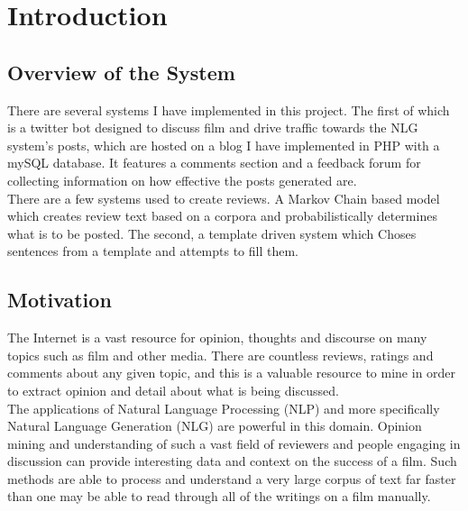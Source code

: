 %

\chapter{\label{ch:1-intro}Introduction} 

\minitoc

\section{Overview of the System}

There are several systems I have implemented in this project. The first of which is a twitter bot designed to discuss film and drive traffic towards the NLG system's posts, which are hosted on a blog I have implemented in PHP with a mySQL database. It features a comments section and a feedback forum for collecting information on how effective the posts generated are.\\
There are a few systems used to create reviews. A Markov Chain based model which creates review text based on a corpora and probabilistically determines what is to be posted.
The second, a template driven system which Choses sentences from a template and attempts to fill them. 


\section{Motivation}

The Internet is a vast resource for opinion, thoughts and discourse on many topics such as film and other media. There are countless reviews, ratings and comments about any given topic, and this is a valuable resource to mine in order to extract opinion and detail about what is being discussed.\\

The applications of Natural Language Processing (NLP) and more specifically Natural Language Generation (NLG) are powerful in this domain.  Opinion mining and understanding of such a vast field of reviewers and people engaging in discussion can provide interesting data and context on the success of a film. Such methods are able to process and understand a very large corpus of text far faster than one may be able to read through all of the writings on a film manually. \\

